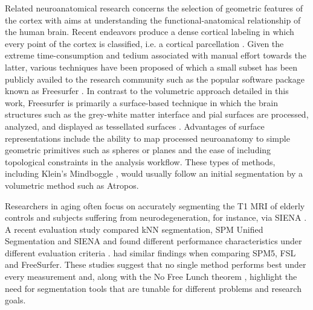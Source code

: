 \documentclass[11pt,english]{article}
\begin{document}
Related neuroanatomical research concerns the selection of geometric
features of the cortex \citep[e.g.][]{Goualher1999} with aims at
understanding the functional-anatomical relationship of the human
brain. Recent endeavors produce a dense cortical labeling in which
every point of the cortex is classified, i.e. a cortical parcellation
\citep{Fischl2004,Heckemann2006,Destrieux2010}.  Given the extreme
time-consumption and tedium associated with manual effort towards the
latter, various techniques have been proposed of which a small subset
has been publicly availed to the research community such as the
popular software package known as Freesurfer
\citep{Dale1999,Fischl1999,Fischl2004}.  In contrast to the volumetric
approach detailed in this work, Freesurfer is primarily a
surface-based technique in which the brain structures such as the
grey-white matter interface and pial surfaces are processed, analyzed,
and displayed as tessellated surfaces  \citep{Dale1999,Fischl1999}.
Advantages of surface representations include the ability to map
processed neuroanatomy to simple geometric primitives such as spheres
or planes and the ease of including topological constraints in the
analysis workflow.  These types of methods, including Klein's
Mindboggle \citep{Klein2005}, would usually follow an initial segmentation by a 
volumetric method such as Atropos.  


Researchers in aging often focus on
accurately segmenting the T1 MRI of elderly controls and subjects
suffering from neurodegeneration, for instance, via SIENA \citep{Smith2007}.  A recent evaluation study 
compared kNN segmentation, SPM Unified Segmentation and SIENA and
found different performance
characteristics under different evaluation criteria
\citep{Bresser2011}.  \cite{Klauschen2009} had similar findings when
comparing SPM5, FSL and FreeSurfer.  These studies suggest that no
single method performs best under every measurement and, along with the No
Free Lunch theorem \citep{Wolpert1997}, highlight the need for segmentation tools that are tunable for different
problems and research goals.  
\end{document}
